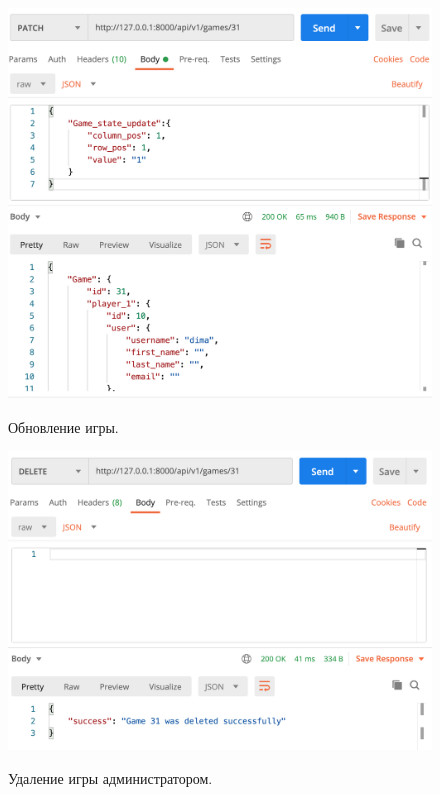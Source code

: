 \documentclass[a4paper,14pt]{extarticle}
\begin{document}
 	\begin{figure}[h!]
 		\begin{center}
 			{\includegraphics[scale = 0.5]{img/refresh_game.png}}
 			\label{ris:refresh_game}
 		\end{center}
 		\caption{Обновление игры.}
 	\end{figure}
 
 	\newpage
 
 	\begin{figure}[h!]
 		\begin{center}
 			{\includegraphics[scale = 0.5]{img/delete_game.png}}
 			\label{ris:delete_game}
 		\end{center}
 		\caption{Удаление игры администратором.}
 	\end{figure}
 	
\end{document}
